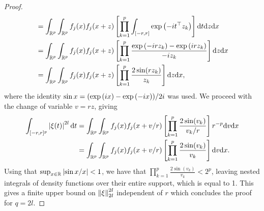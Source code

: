 \begin{proof}
\begin{align*}
        &= \intRp{x}{\intRp{z}{f_j(x)f_j(x + z)\left[\prod_{k=1}^p \int_{[-r, r]}\expf{-it^\top z_k}\right]\d t}}\\
        &= \intRp{x}{\intRp{z}{f_j(x)f_j(x + z)\left[\prod_{k=1}^p \frac{\expf{-irz_k} - \expf{irz_k}}{-iz_k} \right]}}\\
        &= \intRp{x}{\intRp{z}{f_j(x)f_j(x + z)\left[\prod_{k=1}^p \frac{2 \sin(rz_k)}{z_k} \right]}},
    \end{align*}
    where the identity $\sin x = (\expf{ix} - \expf{-ix}) / 2i$ was used. We proceed with the change of variable $v = r z$, giving
    \begin{align*}
        \int_{[-r, r]^p} \abs{\xi(t)}^{2l} \d t
        &= \intRp{x}{\intRp{v}{f_j(x)f_j(x + v/r)\left[\prod_{k=1}^p \frac{2 \sin(v_k)}{v_k/r} \right] r^{-p}}}\\
        &= \intRp{x}{\intRp{v}{f_j(x)f_j(x + v/r)\left[\prod_{k=1}^p \frac{2 \sin(v_k)}{v_k} \right]}}.
    \end{align*}
    Using that $\sup_{x \in \R} \abs{\sin x / x} < 1$, we have that $\prod_{k=1}^p \frac{2 \sin(v_k)}{v_k} < 2^p$, leaving nested integrals of density functions over their entire support, which is equal to 1. This gives a finite upper bound on $\norm{\xi}_{2l}^{2l}$ independent of $r$ which concludes the proof for $q = 2l$.
\end{proof}